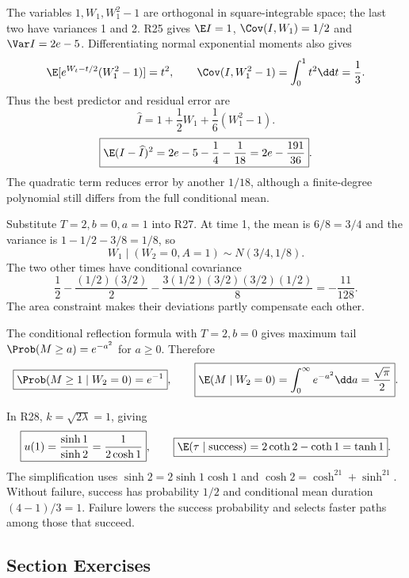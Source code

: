 The variables $1,W_1,W_1^2-1$ are orthogonal in square-integrable space; the last two have variances 1 and 2. R25 gives $\E I=1$, $\Cov(I,W_1)=1/2$ and $\Var I=2e-5$. Differentiating normal exponential moments also gives
\[
 \E[e^{W_t-t/2}(W_1^2-1)]=t^2,\qquad
 \Cov(I,W_1^2-1)=\int_0^1t^2\dd t=\frac13.
\]
Thus the best predictor and residual error are
\[
 \boxed{\widehat I=1+\frac12W_1+\frac16(W_1^2-1)}.
\]
\[
 \boxed{\E(I-\widehat I)^2=2e-5-\frac14-\frac1{18}=2e-\frac{191}{36}}.
\]
The quadratic term reduces error by another $1/18$, although a finite-degree polynomial still differs from the full conditional mean.

Substitute $T=2,b=0,a=1$ into R27. At time 1, the mean is $6/8=3/4$ and the variance is $1-1/2-3/8=1/8$, so
\[
 \boxed{W_1\mid(W_2=0,A=1)\sim N(3/4,1/8)}.
\]
The two other times have conditional covariance
\[
 \boxed{\frac12-\frac{(1/2)(3/2)}2
 -\frac{3(1/2)(3/2)(3/2)(1/2)}8=-\frac{11}{128}}.
\]
The area constraint makes their deviations partly compensate each other.

The conditional reflection formula with $T=2,b=0$ gives maximum tail $\Prob(M\ge a)=e^{-a^2}$ for $a\ge0$. Therefore
\[
 \boxed{\Prob(M\ge1\mid W_2=0)=e^{-1}},\qquad
 \boxed{\E(M\mid W_2=0)=\int_0^\infty e^{-a^2}\dd a=\frac{\sqrt\pi}{2}}.
\]

In R28, $k=\sqrt{2\lambda}=1$, giving
\[
 \boxed{u(1)=\frac{\sinh1}{\sinh2}=\frac1{2\cosh1}},\qquad
 \boxed{\E(\tau\mid\text{success})=2\coth2-\coth1=\tanh1}.
\]
The simplification uses $\sinh2=2\sinh1\cosh1$ and $\cosh2=\cosh^21+\sinh^21$. Without failure, success has probability $1/2$ and conditional mean duration $(4-1)/3=1$. Failure lowers the success probability and selects faster paths among those that succeed.

\par{}
\subsection*{Section Exercises}








